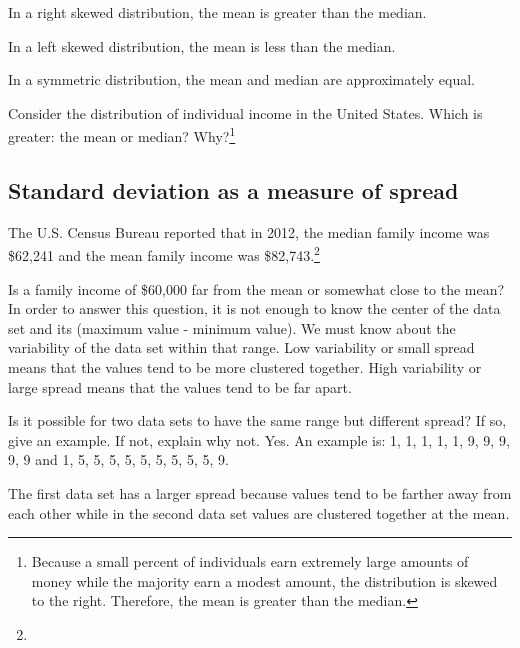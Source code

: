 
\begin{termBox}{
In a right skewed distribution, the mean is greater than the median.

In a left skewed distribution, the mean is less than the median.

In a symmetric distribution, the mean and median are approximately equal.}
\end{termBox}

\begin{exercise}Consider the distribution of individual income in the United States. Which is greater: the mean or median? Why?\footnote{Because a small percent of individuals earn extremely large amounts of money while the majority earn a modest amount, the distribution is skewed to the right. Therefore, the mean is greater than the median.}
\end{exercise}

\subsection{Standard deviation as a measure of spread}
\label{variability}

The U.S. Census Bureau reported that in 2012, the median family income was \$62,241 and the mean family income was \$82,743.\footnote{}

Is a family income of \$60,000 far from the mean or somewhat close to the mean? In order to answer this question, it is not enough to know the center of the data set and its  (maximum value - minimum value). We must know about the variability of the data set within that range. Low variability or small spread means that the values tend to be more clustered together. High variability or large spread means that the values tend to be far apart.

\begin{example}{Is it possible for two data sets to have the same range but different spread? If so, give an example. If not, explain why not.}
Yes. An example is:  {1, 1, 1, 1, 1, 9, 9, 9, 9, 9} and {1, 5, 5, 5, 5, 5, 5, 5, 5, 5, 9}.

The first data set has a larger spread because values tend to be farther away from each other while in the second data set values are clustered together at the mean.
\end{example}


